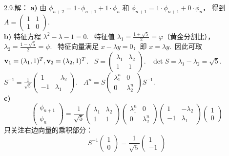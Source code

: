 \begin{exer}
2.9.解：
\textbf{a)}
由 $\phi_{n+2} = 1 \cdot \phi_{n+1} + 1 \cdot \phi_n$ 和 $\phi_{n+1} = 1 \cdot \phi_{n+1} + 0 \cdot \phi_n$，
得到 $A = \begin{pmatrix} 1 & 1 \\ 1 & 0 \end{pmatrix}$.~
\\
\textbf{b)}
特征方程 $\lambda^2 - \lambda - 1 = 0$.~
特征值 $\lambda_1 = \frac{1+\sqrt{5}}{2} = \varphi$（黄金分割比），$\lambda_2 = \frac{1-\sqrt{5}}{2} = \psi$.~
特征向量满足 $x-\lambda y=0$，即 $x=\lambda y$.~因此可取 $\mathbf{v}_1 = (\lambda_1, 1)^T, \mathbf{v}_2 = (\lambda_2, 1)^T$.~
$S = \begin{pmatrix} \lambda_1 & \lambda_2 \\ 1 & 1 \end{pmatrix}$.~
$\det S = \lambda_1 - \lambda_2 = \sqrt{5}$.~
$S^{-1} = \frac{1}{\sqrt{5}} \begin{pmatrix} 1 & -\lambda_2 \\ -1 & \lambda_1 \end{pmatrix}$.~
$A^n = S \begin{pmatrix} \lambda_1^n & 0 \\ 0 & \lambda_2^n \end{pmatrix} S^{-1}$.~
\\
\textbf{c)}
$$ \begin{pmatrix} \phi_{n+1} \\ \phi_n \end{pmatrix} = \frac{1}{\sqrt{5}} \begin{pmatrix} \lambda_1 & \lambda_2 \\ 1 & 1 \end{pmatrix} \begin{pmatrix} \lambda_1^n & 0 \\ 0 & \lambda_2^n \end{pmatrix} \begin{pmatrix} 1 & -\lambda_2 \\ -1 & \lambda_1 \end{pmatrix} \begin{pmatrix} 1 \\ 0 \end{pmatrix} $$
只关注右边向量的乘积部分：
$$ S^{-1} \begin{pmatrix} 1 \\ 0 \end{pmatrix} = \frac{1}{\sqrt{5}} \begin{pmatrix} 1 \\ -1 \end{pmatrix} $$

\end{exer}
